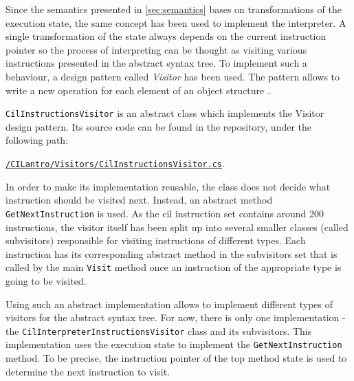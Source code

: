 \documentclass[declaration,shortabstract,english,mgr]{iithesis}
\begin{document}
Since the semantics presented in \ref{sec:semantics} bases on transformations of the execution state, the same concept has been used to implement the interpreter. A single transformation of the state always depends on the current instruction pointer so the process of interpreting can be thought as visiting various instructions presented in the abstract syntax tree. To implement such a behaviour, a design pattern called \textit{Visitor} has been used. The pattern allows to write a new operation for each element of an object structure \cite{designPatterns}.

\texttt{CilInstructionsVisitor} is an abstract class which implements the Visitor design pattern. Its source code can be found in the repository, under the following path:
\begin{center}
\href{https://github.com/kvasnyk/CILantro/blob/master/CILantro/CILantro/Visitors/CilInstructionsVisitor.cs}{\texttt{/CILantro/Visitors/CilInstructionsVisitor.cs}}.
\end{center}
In order to make its implementation reusable, the class does not decide what instruction should be visited next. Instead, an abstract method \texttt{GetNextInstruction} is used. As the \acrshort{cil} instruction set contains around 200 instructions, the visitor itself has been split up into several smaller classes (called subvisitors) responsible for visiting instructions of different types. Each instruction has its corresponding abstract method in the subvisitors set that is called by the main \texttt{Visit} method once an instruction of the appropriate type is going to be visited.

Using such an abstract implementation allows to implement different types of visitors for the abstract syntax tree. For now, there is only one implementation - the \texttt{CilInterpreterInstructionsVisitor} class and its subvisitors. This implementation uses the execution state to implement the \texttt{GetNextInstruction} method. To be precise, the instruction pointer of the top method state is used to determine the next instruction to visit.
\end{document}
